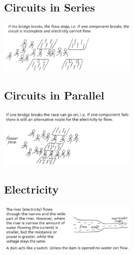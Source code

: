 \begin{multicols}{2}
\subsection*{Circuits in Series}

\begin{center}
\includegraphics[width=0.5\textwidth]{./img/vso/analogy-series.png}
\end{center}

\subsection*{Circuits in Parallel}

\begin{center}
\includegraphics[width=0.5\textwidth]{./img/vso/analogy-parallel.png}
\end{center}

\subsection*{Electricity}

\begin{center}
\includegraphics[width=0.5\textwidth]{./img/vso/analogy-elec.png}
\end{center}



\end{multicols}

\pagebreak